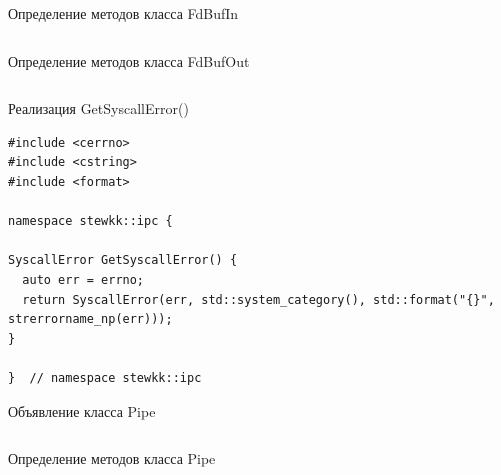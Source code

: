 \documentclass[14pt, russian]{scrartcl}
\begin{document}
\begin{listing}[H]
  \caption{Определение методов класса FdBufIn}
  \label{lst:fdbufin_definition}
  \inputminted[style=bw, breaklines, frame=single, fontsize = \footnotesize, linenos=false, xleftmargin = 1.5em]{cpp}{./listings/fdbufin_definition.cpp}
\end{listing}

\begin{listing}[H]
  \caption{Определение методов класса FdBufOut}
  \label{lst:fdbufout_definition}
  \inputminted[style=bw, breaklines, frame=single, fontsize = \footnotesize, linenos=false, xleftmargin = 1.5em]{cpp}{./listings/fdbufout_definition.cpp}
\end{listing}

\begin{listing}[H]
  \caption{Реализация GetSyscallError()}
  \label{lst:errors_definition}
  \begin{verbatim}
#include <cerrno>
#include <cstring>
#include <format>

namespace stewkk::ipc {

SyscallError GetSyscallError() {
  auto err = errno;
  return SyscallError(err, std::system_category(), std::format("{}", strerrorname_np(err)));
}

}  // namespace stewkk::ipc
  \end{verbatim}
\end{listing}

\begin{listing}[H]
  \caption{Объявление класса Pipe}
  \label{lst:pipe_definition}
  \inputminted[style=bw, breaklines, frame=single, fontsize = \footnotesize, linenos=false, xleftmargin = 1.5em]{cpp}{./listings/pipe.hpp}
\end{listing}

\begin{listing}[H]
  \caption{Определение методов класса Pipe}
  \label{lst:pipe_declaration}
  \inputminted[style=bw, breaklines, frame=single, fontsize = \footnotesize, linenos=false, xleftmargin = 1.5em]{cpp}{./listings/pipe.cpp}
\end{listing}
\end{document}
